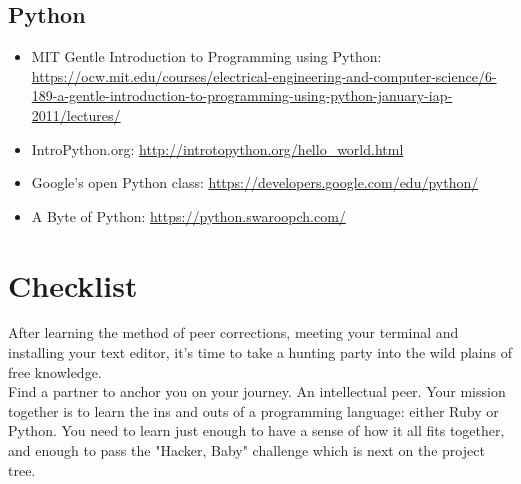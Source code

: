 \documentclass{42-en}
\begin{document}
\section{Python}

\begin{itemize}

	\item MIT Gentle Introduction to Programming using Python: \url{https://ocw.mit.edu/courses/electrical-engineering-and-computer-science/6-189-a-gentle-introduction-to-programming-using-python-january-iap-2011/lectures/}
	\item IntroPython.org: \url{http://introtopython.org/hello_world.html}
	\item Google’s open Python class: \url{https://developers.google.com/edu/python/}
	\item A Byte of Python: \url{https://python.swaroopch.com/}

\end{itemize}



\chapter{Checklist}

After learning the method of peer corrections, meeting your terminal and installing your text editor, it's time to take a hunting party into the wild plains of free knowledge.\\

Find a partner to anchor you on your journey. An intellectual peer. Your mission together is to learn the ins and outs of a programming language: either Ruby or Python. You need to learn just enough to have a sense of how it all fits together, and enough to pass the "Hacker, Baby" challenge which is next on the project tree.\\
\end{document}

